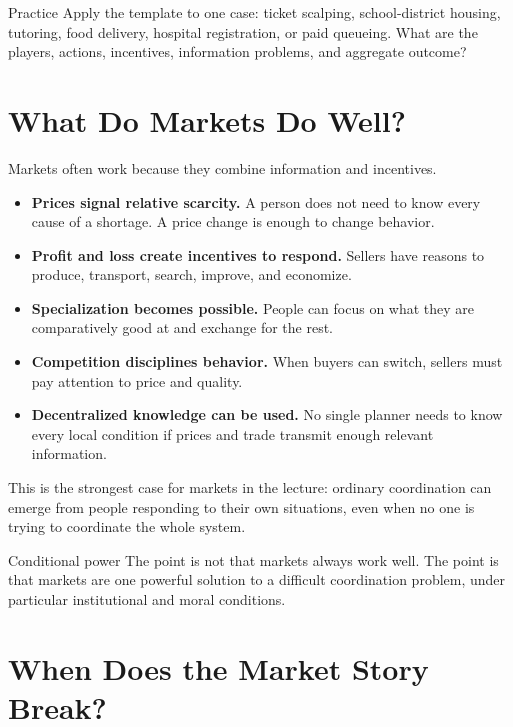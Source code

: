 \documentclass[10pt,a4paper]{article}
\begin{document}
\begin{discussionbox}{Practice}
Apply the template to one case: ticket scalping, school-district housing, tutoring, food delivery, hospital registration, or paid queueing. What are the players, actions, incentives, information problems, and aggregate outcome?
\end{discussionbox}

\section{What Do Markets Do Well?}

Markets often work because they combine information and incentives.

\begin{itemize}
  \item \textbf{Prices signal relative scarcity.} A person does not need to know every cause of a shortage. A price change is enough to change behavior.
  \item \textbf{Profit and loss create incentives to respond.} Sellers have reasons to produce, transport, search, improve, and economize.
  \item \textbf{Specialization becomes possible.} People can focus on what they are comparatively good at and exchange for the rest.
  \item \textbf{Competition disciplines behavior.} When buyers can switch, sellers must pay attention to price and quality.
  \item \textbf{Decentralized knowledge can be used.} No single planner needs to know every local condition if prices and trade transmit enough relevant information.
\end{itemize}

This is the strongest case for markets in the lecture: ordinary coordination can emerge from people responding to their own situations, even when no one is trying to coordinate the whole system.

\begin{insightbox}{Conditional power}
The point is not that markets always work well. The point is that markets are one powerful solution to a difficult coordination problem, under particular institutional and moral conditions.
\end{insightbox}

\section{When Does the Market Story Break?}
\end{document}

